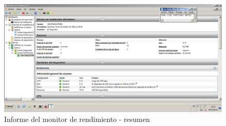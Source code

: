 \begin{figure}[H] %
\centering
\includegraphics[scale=0.4]{./imagenes/P3_4_1.png} 
\caption{Informe del monitor de rendimiento - resumen} \label{fig:P3_4_1}
\end{figure}










